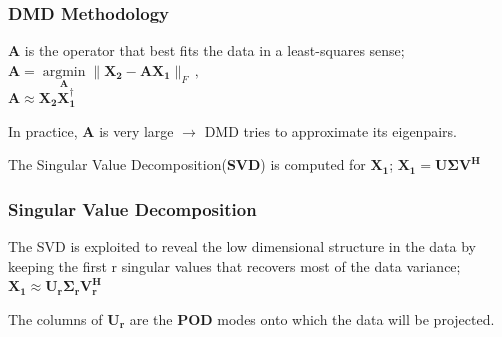 \documentclass[fleqn]{beamer}
\DeclareMathOperator*{\argmin}{argmin}
\begin{document}
\begin{frame}
\frametitle{DMD Methodology}
\begin{block}{}
$\mathbf{A}$ is the operator that best fits the data in a least-squares sense;
\centering
$\mathbf{A}=\argmin\limits_{\mathbf{A}}\|\mathbf{X_{2}} -\mathbf{AX_{1}}\|_F \, ,
$\\
${\mathbf{A}\approx\mathbf{X_2}\mathbf{X_1^{\dagger}}} $
\end{block}
\begin{block}{}
In practice, $\mathbf{A}$  is very large $\to$ DMD tries to approximate its eigenpairs.
\end{block}
\begin{block}{}
The Singular Value Decomposition(\textbf{SVD}) is computed for $\mathbf{X_1}$;
\centering
${\mathbf{X_1} = \mathbf{U}\boldsymbol{\Sigma}\mathbf{V^{H}} }$
\end{block}
\end{frame}

  \begin{frame}
  \frametitle{Singular Value Decomposition}
\begin{block}{}
The SVD is exploited to reveal the low dimensional structure in the data by keeping the first r singular values that recovers most of the data variance;\\
\centering
${\mathbf{X_1} \approx \mathbf{U_r}\boldsymbol{\Sigma}_{\mathbf{r}}\mathbf{V_r^{H}} }$
\end{block}
\begin{block}{}
The columns of {$\mathbf{U_r}$} are the \textbf{POD}  modes onto which the data will be projected.  
\end{block}
    \end{frame}
\end{document}
